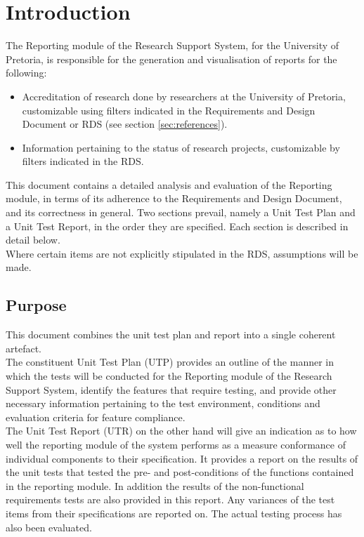 \section{Introduction}
The Reporting module of the Research Support System, for the University of Pretoria, 
is responsible for the generation and visualisation of reports for the following:
\begin{itemize}
	\item Accreditation of research done by researchers at the University of Pretoria, 
	customizable using filters indicated in the Requirements and Design Document or 
	RDS (see section \ref{sec:references}).
	\item Information pertaining to the status of research projects, customizable by 
	filters indicated in the RDS.
\end{itemize}
This document contains a detailed analysis and evaluation of the Reporting module, 
in terms of its adherence to the Requirements and Design Document, and its 
correctness in general. Two sections prevail, namely a Unit Test Plan and 
a Unit Test Report, in the order they are specified. Each section is described 
in detail below. \\
Where certain items are not explicitly stipulated in the RDS, assumptions will be made.

\subsection{Purpose}
This document combines the unit test plan and report into a single coherent artefact.\\
The constituent Unit Test Plan (UTP) provides an outline of the manner in which the tests 
will be conducted for the Reporting module of the Research Support System, identify the 
features that require testing, and provide other necessary information pertaining to 
the test environment, conditions and evaluation criteria for feature compliance. \\
The Unit Test Report (UTR) on the other hand will give an indication as to how well the 
reporting module of the system performs as a measure conformance of individual 
components to their specification. It provides a report on the results of the unit 
tests that tested the pre- and post-conditions of the functions contained in the 
reporting module. In addition the results of the non-functional requirements 
tests are also provided in this report. Any variances of the test items 
from their specifications are reported on. The actual testing process 
has also been evaluated.

